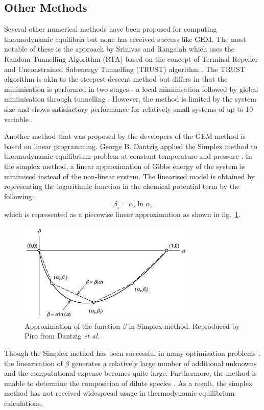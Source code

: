 	\subsection{Other Methods}
	Several other numerical methods have been proposed for computing thermodynamic equilibria but none has received success like GEM. The most notable of these is the approach by Srinivas and Rangaiah which uses  the Random Tunnelling Algorithm (RTA) based on the concept of Terminal Repeller and Unconstrained Subenergy Tunnelling (TRUST) algorithm \cite{Srinivas06}. The TRUST algorithm is akin to the steepest descent method but differs in that the minimisation is performed in two stages - a local minimisation followed by global minimisation through tunnelling \cite{Nocedal06}.  However, the method is limited by the system size and shows satisfactory performance for relatively small systems of up to 10 variable \cite{Nocedal06}.

	Another method that was proposed by the developers of the GEM method is based on linear programming. George B. Dantzig applied the Simplex method to thermodynamic equilibrium problem at constant temperature and pressure \cite{Dantzig:1957aa,Dantzig:1958aa}. In the simplex method, a linear approximation of Gibbs energy of the system is minimised instead of the non-linear system. The linearised model is obtained by representing the logarithmic function in the chemical potential term by the following:
	\begin{equation}
		\beta_i = \alpha_i \ln \alpha_i
	\end{equation}
 which is represented as a piecewise linear approximation as shown in fig.~\ref{fig:simplex}.
 	\begin{figure}[htbp]
		\centering
		\includegraphics[width=0.75\textwidth]{figures/Simplex}
		\caption[Approximation of the function $\beta$ in simplex method.]{Approximation of the function $\beta$ in Simplex method. Reproduced by Piro \cite{Piro11b} from Dantzig \textit{et al.} \cite{Dantzig:1957aa}}
		\label{fig:simplex}
	\end{figure}
	Though the Simplex method has been successful in many optimisation problems \cite{Dantzig:2016aa}, the linearisation of $\beta$ generates a relatively large number of additional unknowns and the computational expense becomes quite large. Furthermore, the method is unable to determine the composition of dilute species \cite{vanZeggeren11}. As a result, the simplex method has not received widespread usage in thermodynamic equilibrium calculations.


